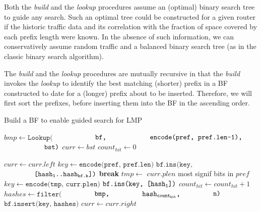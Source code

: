 \documentclass[conference,compsoc]{IEEEtran}
\begin{document}
Both the \emph{build} and the \emph{lookup} procedures assume an (optimal)
binary search tree to guide any search. Such an optimal tree could be
constructed for a given router if the historic traffic data and its 
correlation with the fraction of space covered by each prefix length
were known. In the absence of such information, we can conservatively
assume random traffic and a balanced binary search tree (as in the
classic binary search algorithm).

The \emph{build} and the \emph{lookup} procedures are mutually recursive
in that the \emph{build} invokes the \emph{lookup} to identify the
best matching (shorter) prefix in a BF constructed to date for a (longer) prefix 
about to be inserted. Therefore, we will first sort the prefixes, before inserting them 
into the BF in the ascending order.

\begin{algorithm}
  \caption{Build a BF to enable guided search for LMP}\label{alg:build}
  \begin{algorithmic}[1]


    \State $bmp \gets \texttt{Lookup(}$
        \State $\hspace*{20mm} \texttt{bf,}$
        \State $\hspace*{20mm} \texttt{encode(pref, pref.len-1),}$
        \State $\hspace*{20mm} \texttt{bst)}$
    \State $curr \gets bst$
    \State $count_{hit} \gets 0$


        \State $curr \gets curr.left$
        \State $key \gets \texttt{encode(pref, pref.len)}$
        \State $\texttt{bf.ins(key,}$
                \State $\hspace*{15mm} \texttt{[hash\textsubscript{1}..hash\textsubscript{bf.k}])}$
        \State \textbf{break}
      \Else
        \State $tmp \gets$ $curr.plen$ most signif bits in $pref$
        \State $key \gets \texttt{encode(tmp, curr.plen)}$
        \State $\texttt{bf.ins(key, [hash\textsubscript{1}])}$
        \State $count_{hit} \gets count_{hit} + 1$
        \State $hashes \gets \texttt{filter(}$
              \State $\hspace*{15mm} \texttt{bmp,}$
              \State $\hspace*{15mm} \texttt{hash\textsubscript{count\textsubscript{hit}},}$
              \State $\hspace*{15mm} \texttt{n)}$
        \State $\texttt{bf.insert(key, hashes)}$
        \State $curr \gets curr.right$
      \EndIf
    \EndWhile
    \EndProcedure

  \end{algorithmic}
\end{algorithm}
\end{document}
